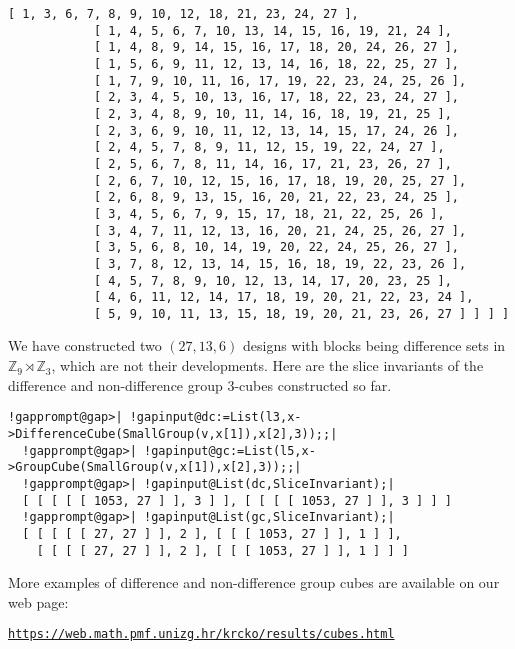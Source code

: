 \documentclass[a4paper,11pt]{report}
\begin{document}
{{\begin{Verbatim}[commandchars=!@|,fontsize=\small,frame=single,label=Example]
            [ 1, 3, 6, 7, 8, 9, 10, 12, 18, 21, 23, 24, 27 ], 
            [ 1, 4, 5, 6, 7, 10, 13, 14, 15, 16, 19, 21, 24 ], 
            [ 1, 4, 8, 9, 14, 15, 16, 17, 18, 20, 24, 26, 27 ], 
            [ 1, 5, 6, 9, 11, 12, 13, 14, 16, 18, 22, 25, 27 ], 
            [ 1, 7, 9, 10, 11, 16, 17, 19, 22, 23, 24, 25, 26 ], 
            [ 2, 3, 4, 5, 10, 13, 16, 17, 18, 22, 23, 24, 27 ], 
            [ 2, 3, 4, 8, 9, 10, 11, 14, 16, 18, 19, 21, 25 ], 
            [ 2, 3, 6, 9, 10, 11, 12, 13, 14, 15, 17, 24, 26 ], 
            [ 2, 4, 5, 7, 8, 9, 11, 12, 15, 19, 22, 24, 27 ], 
            [ 2, 5, 6, 7, 8, 11, 14, 16, 17, 21, 23, 26, 27 ], 
            [ 2, 6, 7, 10, 12, 15, 16, 17, 18, 19, 20, 25, 27 ], 
            [ 2, 6, 8, 9, 13, 15, 16, 20, 21, 22, 23, 24, 25 ], 
            [ 3, 4, 5, 6, 7, 9, 15, 17, 18, 21, 22, 25, 26 ], 
            [ 3, 4, 7, 11, 12, 13, 16, 20, 21, 24, 25, 26, 27 ], 
            [ 3, 5, 6, 8, 10, 14, 19, 20, 22, 24, 25, 26, 27 ], 
            [ 3, 7, 8, 12, 13, 14, 15, 16, 18, 19, 22, 23, 26 ], 
            [ 4, 5, 7, 8, 9, 10, 12, 13, 14, 17, 20, 23, 25 ], 
            [ 4, 6, 11, 12, 14, 17, 18, 19, 20, 21, 22, 23, 24 ], 
            [ 5, 9, 10, 11, 13, 15, 18, 19, 20, 21, 23, 26, 27 ] ] ] ]
\end{Verbatim}
 We have constructed two $(27,13,6)$ designs with blocks being difference sets in ${\ensuremath{\mathbb Z}}_9\rtimes {\ensuremath{\mathbb Z}}_3$, which are not their developments. Here are the slice invariants of the
difference and non-difference group 3-cubes constructed so far. 
\begin{Verbatim}[commandchars=!@|,fontsize=\small,frame=single,label=Example]
  !gapprompt@gap>| !gapinput@dc:=List(l3,x->DifferenceCube(SmallGroup(v,x[1]),x[2],3));;|
  !gapprompt@gap>| !gapinput@gc:=List(l5,x->GroupCube(SmallGroup(v,x[1]),x[2],3));;|
  !gapprompt@gap>| !gapinput@List(dc,SliceInvariant);|
  [ [ [ [ [ 1053, 27 ] ], 3 ] ], [ [ [ [ 1053, 27 ] ], 3 ] ] ]
  !gapprompt@gap>| !gapinput@List(gc,SliceInvariant);|
  [ [ [ [ [ 27, 27 ] ], 2 ], [ [ [ 1053, 27 ] ], 1 ] ], 
    [ [ [ [ 27, 27 ] ], 2 ], [ [ [ 1053, 27 ] ], 1 ] ] ]
\end{Verbatim}
 More examples of difference and non-difference group cubes are available on
our web page: 

 \href{https://web.math.pmf.unizg.hr/~krcko/results/cubes.html} {\texttt{https://web.math.pmf.unizg.hr/\texttt{}krcko/results/cubes.html}} }

 
}
\end{document}
